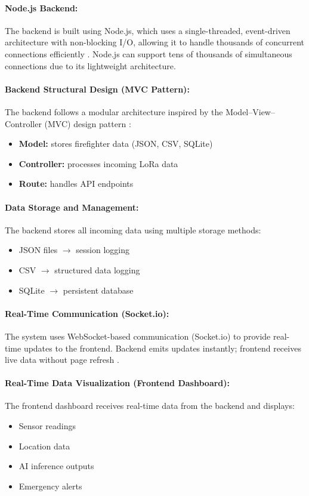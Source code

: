 \documentclass[12pt,a4paper]{article}
\begin{document}
	\paragraph{Node.js Backend:}
	The backend is built using Node.js, which uses a single-threaded, event-driven architecture with non-blocking I/O, allowing it to handle thousands of concurrent connections efficiently \cite{huang2020}. Node.js can support tens of thousands of simultaneous connections due to its lightweight architecture.
	
	\paragraph{Backend Structural Design (MVC Pattern):}
	The backend follows a modular architecture inspired by the Model--View--Controller (MVC) design pattern \cite{senivongse2025}:
	\begin{itemize}
		\item \textbf{Model:} stores firefighter data (JSON, CSV, SQLite)
		\item \textbf{Controller:} processes incoming LoRa data
		\item \textbf{Route:} handles API endpoints
	\end{itemize}
	
	\paragraph{Data Storage and Management:}
	The backend stores all incoming data using multiple storage methods:
	\begin{itemize}
		\item JSON files $\rightarrow$ session logging
		\item CSV $\rightarrow$ structured data logging
		\item SQLite $\rightarrow$ persistent database
	\end{itemize}
	
	\paragraph{Real-Time Communication (Socket.io):}
	The system uses WebSocket-based communication (Socket.io) to provide real-time updates to the frontend. Backend emits updates instantly; frontend receives live data without page refresh \cite{chaplia2023}.
	
	\paragraph{Real-Time Data Visualization (Frontend Dashboard):}
	The frontend dashboard receives real-time data from the backend and displays:
	\begin{itemize}
		\item Sensor readings
		\item Location data
		\item AI inference outputs
		\item Emergency alerts
	\end{itemize}
	
\end{document}
